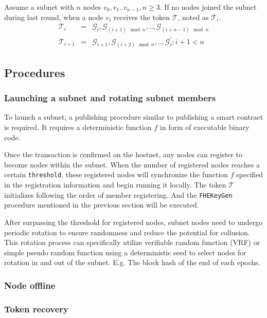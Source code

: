 \documentclass[11pt]{article}
\begin{document}
Assume a subnet with $n$ nodes \( v_{0}, v_{1} .. v_{n-1}, n\geq 3\). If no nodes joined the subnet during last round, when a node $v_{i}$ receives the token $\mathcal{T}$, noted as $\mathcal{T}_{i}$.
\begin{eqnarray*}
\mathcal{T}_{i} &=& \mathcal{G}_{i}, \mathcal{G}_{(i + 1)\mod n},.., \mathcal{G}_{(i + n - 1)\mod n}\\
\mathcal{T}_{i+1} &=& \mathcal{G}_{i+1}, \mathcal{G}_{(i+2)\mod n},.., \mathcal{G}_{i}^{\prime}; i+1<n
\end{eqnarray*}

\subsection{Procedures}
\subsubsection{Launching a subnet and rotating subnet members}
To launch a subnet, a publishing procedure similar to publishing a smart contract is required.
It requires a deterministic function $f$ in form of executable binary code.

Once the transaction is confirmed on the hostnet, any nodes can register to become nodes within the subnet.
When the number of registered nodes reaches a certain \texttt{threshold}, these registered nodes will synchronize the function $f$ specified in the registration information and begin running it locally.
The token $\mathcal{T}$ initializes following the order of member registering.
And the \texttt{FHEKeyGen} procedure mentioned in the previous section will be executed.

After surpassing the threshold for registered nodes, subnet nodes need to undergo periodic rotation to ensure randomness and reduce the potential for collusion.
This rotation process can specifically utilize verifiable random function (VRF) or simple pseudo random function using a deterministic seed to select nodes for rotation in and out of the subnet. E.g. The block hash of the end of each epochs.


\subsubsection{Node offline}


\subsubsection{Token recovery}
\end{document}
